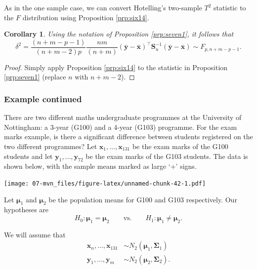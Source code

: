 \documentclass[]{book}
\newtheorem{corollary}{Corollary}[chapter]
\theoremstyle{definition}
\theoremstyle{definition}
\theoremstyle{definition}
\theoremstyle{remark}
\begin{document}
As in the one sample case, we can convert Hotelling's two-sample \(T^2\) statistic to the \(F\) distribution using Proposition \ref{prp:six14}.

\begin{corollary}
\protect\hypertarget{cor:cseven1}{}{\label{cor:cseven1} }Using the notation of Proposition \ref{prp:seven1}, it follows that
\[\delta^2 = \frac{(n+m-p-1)}{(n+m-2)p} \frac{nm}{(n+m)} (\bar{\boldsymbol y} - \bar{\boldsymbol x})^\top \boldsymbol S_u^{-1} (\bar{\boldsymbol y} - \bar{\boldsymbol x}) \sim F_{p,n+m-p-1}.\]
\end{corollary}

\begin{proof}
{}Simply apply Proposition \ref{prp:six14} to the statistic in Proposition \ref{prp:seven1} (replace \(n\) with \(n+m-2\)).
\end{proof}

\hypertarget{example-continued-1}{%
\subsubsection*{Example continued}\label{example-continued-1}}

There are two different maths undergraduate programmes at the University of Nottingham: a 3-year (G100) and a 4-year (G103) programme. For the exam marks example, is there a significant difference between students registered on the two different programmes? Let \(\boldsymbol x_1,\ldots, \boldsymbol x_{131}\) be the exam marks of the G100 students and let \(\boldsymbol y_1,\ldots, \boldsymbol y_{72}\) be the exam marks of the G103 students. The data is shown below, with the sample means marked as large `+' signs.

\texttt{[image: 07-mvn\_files/figure-latex/unnamed-chunk-42-1.pdf]}

Let \(\boldsymbol \mu_1\) and \(\boldsymbol \mu_2\) be the population means for G100 and G103 respectively. Our hypotheses are
\[H_0: \boldsymbol \mu_1 = \boldsymbol \mu_2 \qquad \text{vs.} \qquad H_1: \boldsymbol \mu_1 \neq \boldsymbol \mu_2.\]

We will assume that
\begin{align*}
\boldsymbol x_n, \ldots, \boldsymbol x_{131}&\sim N_2(\boldsymbol \mu_1,\boldsymbol \Sigma_1)\\
\boldsymbol y_1,\ldots,\boldsymbol y_m &\sim  N_2(\boldsymbol \mu_2,\boldsymbol \Sigma_2).
\end{align*}
\end{document}
